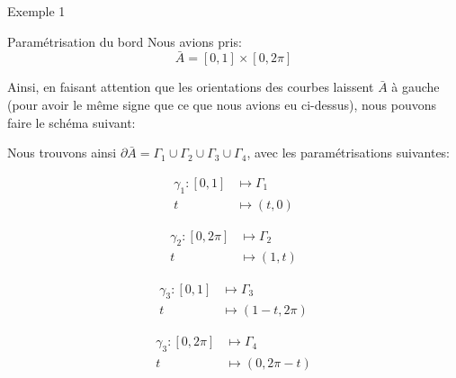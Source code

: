 \documentclass[a4paper]{article}
\begin{document}
\begin{parag}{Exemple 1}
    \begin{subparag}{Paramétrisation du bord}
        Nous avions pris: 
        \[\bar{A} = \left[0, 1\right] \times \left[0, 2\pi\right]\]

        Ainsi, en faisant attention que les orientations des courbes laissent $\bar{A}$ à gauche (pour avoir le même signe que ce que nous avions eu ci-dessus), nous pouvons faire le schéma suivant:

        Nous trouvons ainsi $\partial \bar{A} = \Gamma_1 \cup \Gamma_2 \cup \Gamma_3 \cup \Gamma_4$, avec les paramétrisations suivantes:
        \begin{center}
        \begin{minipage}{0.45\textwidth}
        \[\begin{split}
        \gamma_1: \left[0, 1\right] &\longmapsto \Gamma_1 \\
        t &\longmapsto \left(t, 0\right)
        \end{split}\]
        \end{minipage}
        \hfill
        \begin{minipage}{0.45\textwidth}
        \[\begin{split}
        \gamma_2: \left[0, 2\pi\right] &\longmapsto \Gamma_2 \\
        t &\longmapsto \left(1, t\right)
        \end{split}\]
        \end{minipage}
        \end{center}

        \begin{center}
        \begin{minipage}{0.45\textwidth}
        \[\begin{split}
        \gamma_3: \left[0, 1\right] &\longmapsto \Gamma_3 \\
        t &\longmapsto \left(1 - t, 2\pi\right)
        \end{split}\]
        \end{minipage}
        \hfill
        \begin{minipage}{0.45\textwidth}
        \[\begin{split}
        \gamma_3: \left[0, 2\pi\right] &\longmapsto \Gamma_4 \\
        t &\longmapsto \left(0, 2\pi - t\right)
        \end{split}\]
        \end{minipage}
        \end{center}
        

\end{subparag}
\end{parag}
\end{document}
